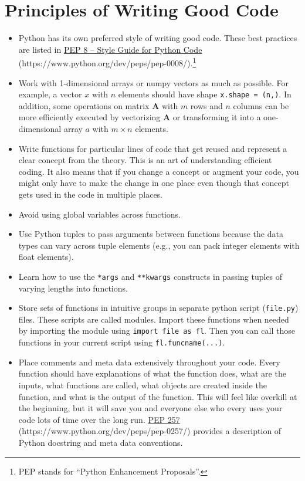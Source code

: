 \section{Principles of Writing Good Code}\label{SecPythonPrinc}

  \begin{itemize}
    \item Python has its own preferred style of writing good code. These best practices are listed in \href{https://www.python.org/dev/peps/pep-0008/}{PEP 8 -- Style Guide for Python Code} (https://www.python.org/dev/peps/pep-0008/).\footnote{PEP stands for ``Python Enhancement Proposals''.}
    \item Work with 1-dimensional arrays or numpy vectors as much as possible. For example, a vector $x$ with $n$ elements should have shape \texttt{x.shape = (n,)}. In addition, some operations on matrix $\bm{A}$ with $m$ rows and $n$ columns can be more efficiently executed by vectorizing $\bm{A}$ or transforming it into a one-dimensional array $a$ with $m\times n$ elements.
    \item Write functions for particular lines of code that get reused and represent a clear concept from the theory. This is an art of understanding efficient coding. It also means that if you change a concept or augment your code, you might only have to make the change in one place even though that concept gets used in the code in multiple places.
    \item Avoid using global variables across functions.
    \item Use Python tuples to pass arguments between functions because the data types can vary across tuple elements (e.g., you can pack integer elements with float elements).
    \item Learn how to use the \texttt{*args} and \texttt{**kwargs} constructs in passing tuples of varying lengths into functions.
    \item Store sets of functions in intuitive groups in separate python script (\texttt{file.py}) files. These scripts are called modules. Import these functions when needed by importing the module using \texttt{import file as fl}. Then you can call those functions in your current script using \texttt{fl.funcname(...)}.
    \item Place comments and meta data extensively throughout your code. Every function should have explanations of what the function does, what are the inputs, what functions are called, what objects are created inside the function, and what is the output of the function. This will feel like overkill at the beginning, but it will save you and everyone else who every uses your code lots of time over the long run. \href{https://www.python.org/dev/peps/pep-0257/}{PEP 257} (https://www.python.org/dev/peps/pep-0257/) provides a description of Python docstring and meta data conventions.

\end{itemize}
